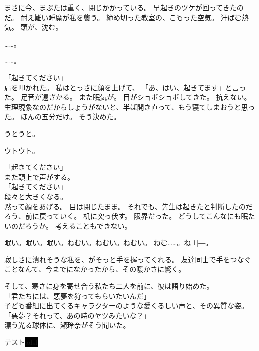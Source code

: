 \documentclass[../IHMain]{subfiles}
\begin{document}
まさに今、まぶたは重く、閉じかかっている。
早起きのツケが回ってきたのだ。
耐え難い睡魔が私を襲う。
締め切った教室の、こもった空気。
汗ばむ熱気。
頭が、沈む。

……。

……。

「起きてください」\\
肩を叩かれた。
私はとっさに顔を上げて、
「あ、はい、起きてます」と言った。
足音が遠ざかる。
また眠気が。
目がショボショボしてきた。
抗えない。
生理現象なのだからしょうがないと、半ば開き直って、もう寝てしまおうと思った。
ほんの五分だけ。
そう決めた。

うとうと。

ウトウト。

「起きてください」\\
また頭上で声がする。\\
「起きてください」\\
段々と大きくなる。\\
黙って顔をあげる。
目は閉じたまま。
それでも、先生は起きたと判断したのだろう、前に戻っていく。
机に突っ伏す。
限界だった。
どうしてこんなにも眠たいのだろうか。
考えることもできない。

眠い。眠い。眠い。ねむい。ねむい。ねむい。
ねむ……。ね\scalebox{3}[1]{―}。


寂しさに潰れそうな私を、がそっと手を握ってくれる。
友達同士で手をつなぐことなんて、今までになかったから、その暖かさに驚く。

そして、寒さに身を寄せ合う私たち二人を前に、彼は語り始めた。\\
「君たちには、悪夢を狩ってもらいたいんだ」\\
子ども番組に出てくるキャラクターのような愛くるしい声と、その異質な姿。
「悪夢？それって、あの時のヤツみたいな？」\\
漂う光る球体に、瀬玲奈がそう聞いた。

テスト\colorbox{black}{adsf}
\end{document}
